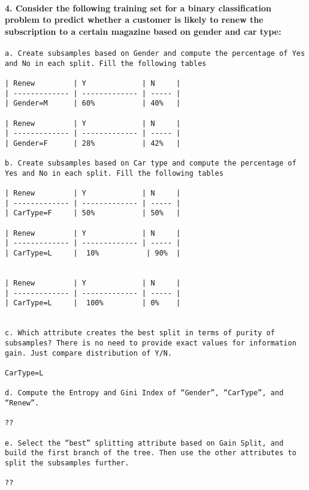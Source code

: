 \documentclass[11pt]{article}
\begin{document}
    \paragraph{4. Consider the following training set for a binary
classification problem to predict whether a customer is likely to renew
the subscription to a certain magazine based on gender and car
type:}\label{consider-the-following-training-set-for-a-binary-classification-problem-to-predict-whether-a-customer-is-likely-to-renew-the-subscription-to-a-certain-magazine-based-on-gender-and-car-type}

\begin{verbatim}
a. Create subsamples based on Gender and compute the percentage of Yes and No in each split. Fill the following tables

| Renew         | Y             | N     |
| ------------- | ------------- | ----- |
| Gender=M      | 60%           | 40%   |

| Renew         | Y             | N     |
| ------------- | ------------- | ----- |
| Gender=F      | 28%           | 42%   |

b. Create subsamples based on Car type and compute the percentage of Yes and No in each split. Fill the following tables

| Renew         | Y             | N     |
| ------------- | ------------- | ----- |
| CarType=F     | 50%           | 50%   |

| Renew         | Y             | N     |
| ------------- | ------------- | ----- |
| CarType=L     |  10%           | 90%  |


| Renew         | Y             | N     |
| ------------- | ------------- | ----- |
| CarType=L     |  100%         | 0%    |


c. Which attribute creates the best split in terms of purity of subsamples? There is no need to provide exact values for information gain. Just compare distribution of Y/N.

CarType=L 

d. Compute the Entropy and Gini Index of “Gender”, “CarType”, and “Renew”.

??

e. Select the “best” splitting attribute based on Gain Split, and build the first branch of the tree. Then use the other attributes to split the subsamples further.

??
\end{verbatim}


    
    
    
    
\end{document}
